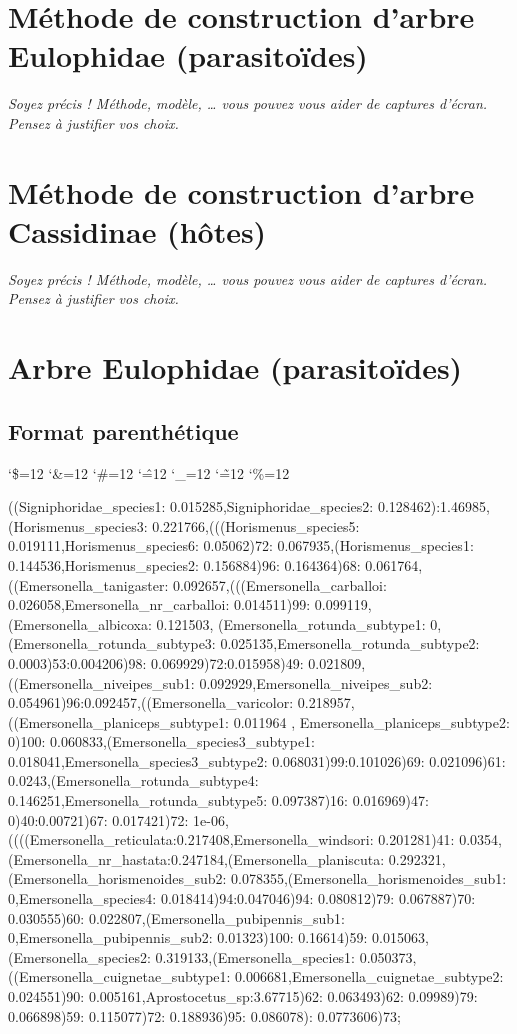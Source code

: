 \documentclass[a4paper, 12pt]{article}
\newenvironment{simplechar}{%
   \catcode`\$=12
   \catcode`\&=12
   \catcode`\#=12
   \catcode`\^=12
   \catcode`\_=12
   \catcode`\~=12
   \catcode`\%=12
}{}
\begin{document}
\section{Méthode de construction d'arbre Eulophidae (parasitoïdes)}

\textit{Soyez précis ! Méthode, modèle, … vous pouvez vous aider de captures d’écran. Pensez à justifier vos choix.}

\section{Méthode de construction d'arbre Cassidinae (hôtes)}

\emph{Soyez précis ! Méthode, modèle, … vous pouvez vous aider de captures d’écran. Pensez à justifier vos choix.}

\section{Arbre Eulophidae (parasitoïdes)}
\subsection{Format parenthétique} 
\begin{simplechar}
((Signiphoridae_species1: 0.015285,Signiphoridae_species2: 0.128462):1.46985,(Horismenus_species3: 0.221766,(((Horismenus_species5: 0.019111,Horismenus_species6: 0.05062)72: 0.067935,(Horismenus_species1: 0.144536,Horismenus_species2: 0.156884)96: 0.164364)68: 0.061764,((Emersonella_tanigaster: 0.092657,(((Emersonella_carballoi: 0.026058,Emersonella_nr_carballoi: 0.014511)99: 0.099119,  (Emersonella_albicoxa: 0.121503, (Emersonella_rotunda_subtype1: 0,(Emersonella_rotunda_subtype3: 0.025135,Emersonella_rotunda_subtype2: 0.0003)53:0.004206)98: 0.069929)72:0.015958)49: 0.021809,((Emersonella_niveipes_sub1: 0.092929,Emersonella_niveipes_sub2: 0.054961)96:0.092457,((Emersonella_varicolor: 0.218957, ((Emersonella_planiceps_subtype1: 0.011964 , Emersonella_planiceps_subtype2: 0)100: 0.060833,(Emersonella_species3_subtype1: 0.018041,Emersonella_species3_subtype2: 0.068031)99:0.101026)69: 0.021096)61: 0.0243,(Emersonella_rotunda_subtype4: 0.146251,Emersonella_rotunda_subtype5: 0.097387)16: 0.016969)47: 0)40:0.00721)67: 0.017421)72: 1e-06,((((Emersonella_reticulata:0.217408,Emersonella_windsori: 0.201281)41: 0.0354,(Emersonella_nr_hastata:0.247184,(Emersonella_planiscuta: 0.292321,(Emersonella_horismenoides_sub2: 0.078355,(Emersonella_horismenoides_sub1: 0,Emersonella_species4: 0.018414)94:0.047046)94: 0.080812)79: 0.067887)70: 0.030555)60: 0.022807,(Emersonella_pubipennis_sub1: 0,Emersonella_pubipennis_sub2: 0.01323)100: 0.16614)59: 0.015063,(Emersonella_species2: 0.319133,(Emersonella_species1: 0.050373,((Emersonella_cuignetae_subtype1: 0.006681,Emersonella_cuignetae_subtype2: 0.024551)90: 0.005161,Aprostocetus_sp:3.67715)62: 0.063493)62: 0.09989)79: 0.066898)59: 0.115077)72: 0.188936)95: 0.086078): 0.0773606)73;
\end{simplechar}
\end{document}
